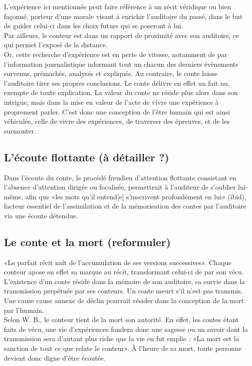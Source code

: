 \documentclass[a4paper,12pt,final,oneside]{article}
\begin{document}
L'expérience ici mentionnée peut faire référence à un récit véridique ou bien façonné, porteur d'une morale visant à enrichir l'auditoire du passé, dans le but de guider celui-ci dans les choix futurs qui se poseront à lui.\\
Par ailleurs, le conteur est dans un rapport de proximité avec son auditoire, ce qui permet l'exposé de la distance.\\
Or, cette recherche d'expérience est en perte de vitesse, notamment de par l'information journalistique informant tout un chacun des derniers évènements survenus, prémachés, analysés et expliqués. Au contraire, le conte laisse l'auditoire tirer ses propres conclusions. Le conte délivre en effet un fait nu, exempte de toute explication. La valeur du conte ne réside plus alors dans son intrigue, mais dans la mise en valeur de l'acte de vivre une expérience à proprement parler. C'est donc une conception de l'être humain qui est ainsi véhiculée, celle de vivre des expériences, de traverser des épreuves, et de les surmonter.\\

\subsection{L'écoute flottante (à détailler ?)}
Dans l'écoute du conte, le procédé freudien d'attention flottante consistant en l'absence d'attention dirigée ou focalisée, permettrait à l'auditeur de s'oublier lui-même, afin que «les mots qu'il entend[e] s'inscrivent profondément en lui» (ibid), facteur essentiel de l'assimilation et de la mémorisation des contes par l'auditoire via une écoute détendue.\\

\subsection{Le conte et la mort (reformuler)}
«Le parfait récit naît de l'accumulation de ses versions successives». Chaque conteur apose en effet sa marque au récit, transformant celui-ci de par son vécu.\\
L'existence d'un conte réside dans la mémoire de son auditoire, sa survie dans la transmission perpétuée par ses conteurs. Un conte meurt s'il n'est pas transmis.\\
Une cause cause annexe de déclin pourrait résider dans la conception de la mort par l'humain.\\
Selon W. B., le conteur tient de la mort son autorité. En effet, les contes étant faits de vécu, une vie d'expériences fondera donc une sagesse ou un savoir dont la transmission sera d'autant plus riche que la vie en fut emplie :  «La mort est la sanction de tout ce que relate le conteur». À l'heure de sa mort, toute personne devient donc digne d'être écoutée.\\
\end{document}
